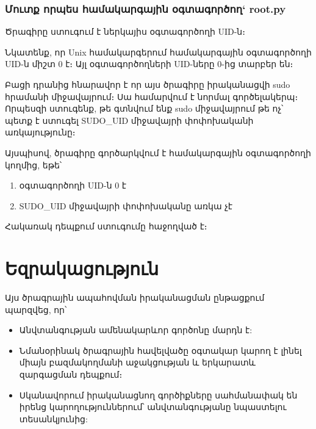 \documentclass[a4paper,12pt]{article}
\begin{document}
\begin{sloppypar}
\subsubsection{Մուտք որպես համակարգային օգտագործող` root.py}


Ծրագիրը ստուգում է ներկայիս օգտագործողի UID-ն։

Նկատենք, որ Unix համակարգերում համակարգային օգտագործողի UID-ն միշտ 0 է։
Այլ օգտագործողների UID-ները 0-ից տարբեր են։

Բացի դրանից հնարավոր է որ այս ծրագիրը իրականացվի sudo հրամանի միջավայրում։
Սա համարվում է նորմալ գործելակերպ։ Որպեսզի ստուգենք, թե գտնվում ենք sudo
միջավայրում թե ոչ՝ պետք է ստուգել SUDO\_UID միջավայրի փոփոխականի
առկայությունը։

Այսպիսով, ծրագիրը գործարկվում է համակարգային օգտագործողի կողմից, եթե՝
\begin{enumerate}
\item օգտագործողի UID-ն 0 է
\item SUDO\_UID միջավայրի փոփոխականը առկա չէ
\end{enumerate}

Հակառակ դեպքում ստուգումը հաջողված է։


\newpage
\section{Եզրակացություն}

Այս ծրագրային ապահովման իրականացման ընթացքում պարզվեց, որ՝

\begin{itemize}
\item Անվտանգության ամենակարևոր գործոնը մարդն է:
\item Նմանօրինակ ծրագրային հավելվածը օգտակար կարող է
    լինել միայն բազմակողմանի աջակցության և երկարատև զարգացման
    դեպքում։
\item Սկանավորում իրականացնող գործիքները սահմանափակ են
    իրենց կարողություններում՝ անվտանգությանը նպաստելու
    տեսանկյունից:
\end{itemize}


\newpage

\end{sloppypar}
\end{document}
